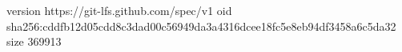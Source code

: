 version https://git-lfs.github.com/spec/v1
oid sha256:cddfb12d05cdd8c3dad00c56949da3a4316dcee18fc5e8eb94df3458a6c5da32
size 369913
